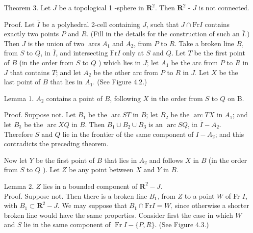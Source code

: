 Theorem 3. Let $J$ be a topological 1 -sphere in $\mathbf{R}^{2}$. Then $\mathbf{R}^{2}$ - $J$ is not connected.

Proof. Let $\bar{I}$ be a polyhedral 2-cell containing $J$, such that $J \cap \mathrm{Fr} I$ contains exactly two points $P$ and $R$. (Fill in the details for the construction of such an $\bar{I}$.) Then $J$ is the union of two $\operatorname{arcs} A_{1}$ and $A_{2}$, from $P$ to $R$. Take a broken line $B$, from $S$ to $Q$, in $\bar{I}$, and intersecting $\mathrm{Fr} I$ only at $S$ and $Q$. Let $T$ be the first point of $B$ (in the order from $S$ to $Q$ ) which lies in $J$; let $A_{1}$ be the arc from $P$ to $R$ in $J$ that contains $T$; and let $A_{2}$ be the other arc from $P$ to $R$ in $J$. Let $X$ be the last point of $B$ that lies in $A_{1}$. (See Figure 4.2.)

\begin{center}
\end{center}


Lemma 1. $A_{2}$ contains a point of $B$, following $X$ in the order from $S$ to $Q$ on B.

Proof. Suppose not. Let $B_{1}$ be the $\operatorname{arc} S T$ in $B$; let $B_{2}$ be the $\operatorname{arc} T X$ in $A_{1}$; and let $B_{3}$ be the $\operatorname{arc} X Q$ in $B$. Then $B_{1} \cup B_{2} \cup B_{3}$ is an $\operatorname{arc} S Q$, in $\bar{I}-A_{2}$. Therefore $S$ and $Q$ lie in the frontier of the same component of $I-A_{2}$; and this contradicts the preceding theorem.

Now let $Y$ be the first point of $B$ that lies in $A_{2}$ and follows $X$ in $B$ (in the order from $S$ to $Q$ ). Let $Z$ be any point between $X$ and $Y$ in $B$.

Lemma 2. $Z$ lies in a bounded component of $\mathbf{R}^{2}-J$.\\
Proof. Suppose not. Then there is a broken line $B_{1}$, from $Z$ to a point $W$ of Fr $I$, with $B_{1} \subset \mathbf{R}^{2}-J$. We may suppose that $B_{1} \cap \mathrm{Fr} I=W$, since otherwise a shorter broken line would have the same properties. Consider first the case in which $W$ and $S$ lie in the same component of $\operatorname{Fr} I- \{P, R\}$. (See Figure 4.3.)

\begin{center}
\end{center}


